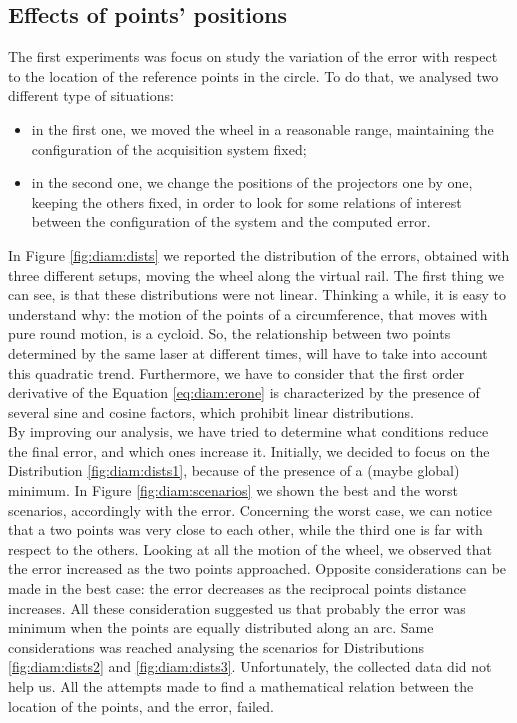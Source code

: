\subsection{Effects of points' positions} %
The first experiments was focus on study the variation of the error with respect to the location of the reference points in the circle. To do that, we analysed two different type of situations:
  \begin{itemize}
    \item in the first one, we moved the wheel in a reasonable range, maintaining the configuration of the acquisition system fixed;
    \item in the second one, we change the positions of the projectors one by one, keeping the others fixed, in order to look for some relations of interest between the configuration of the system and the computed error.
  \end{itemize}

In Figure \ref{fig:diam:dists} we reported the distribution of the errors, obtained with three different setups, moving the wheel along the virtual rail. The first thing we can see, is that these distributions were not linear. Thinking a while, it is easy to understand why: the motion of the points of a circumference, that moves with pure round motion, is a cycloid. So, the relationship between two points determined by the same laser at different times, will have to take into account this quadratic trend. Furthermore, we have to consider that the first order derivative of the Equation \ref{eq:diam:erone} is characterized by the presence of several sine and cosine factors, which prohibit linear distributions. \\
By improving our analysis, we have tried to determine what conditions reduce the final error, and which ones increase it. Initially, we decided to focus on the Distribution \ref{fig:diam:dists1}, because of the presence of a (maybe global) minimum. In Figure \ref{fig:diam:scenarios} we shown the best and the worst scenarios, accordingly with the error. Concerning the worst case, we can notice that a two points was very close to each other, while the third one is far with respect to the others. Looking at all the motion of the wheel, we observed that the error increased as the two points approached. Opposite considerations can be made in the best case: the error decreases as the reciprocal points distance increases. All these consideration suggested us that probably the error was minimum when the points are equally distributed along an arc. Same considerations was reached analysing the scenarios for Distributions \ref{fig:diam:dists2} and \ref{fig:diam:dists3}. Unfortunately, the collected data did not help us. All the attempts made to find a mathematical relation between the location of the points, and the error, failed. \\


